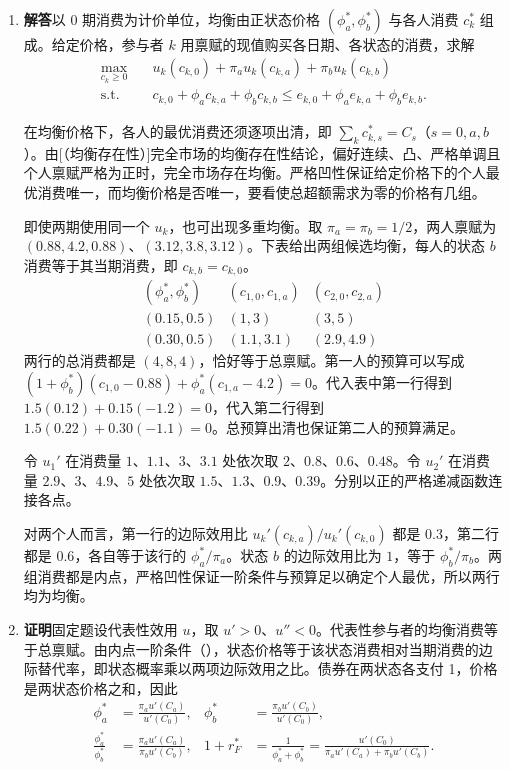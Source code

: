 \begin{solution}[blank-type=manual,blank-vsep=12\baselineskip]
\begin{enumerate}[label=(\alph*)]
 \item \textbf{解答}\quad 以 0 期消费为计价单位，均衡由正状态价格 $(\phi_a^*,\phi_b^*)$ 与各人消费 $c_k^*$ 组成。给定价格，参与者 $k$ 用禀赋的现值购买各日期、各状态的消费，求解
 \[
 \begin{aligned}
 \max_{c_k\ge0}\quad &u_k(c_{k,0})+\pi_a u_k(c_{k,a})+\pi_b u_k(c_{k,b})\\
 \text{s.t.}\quad &c_{k,0}+\phi_ac_{k,a}+\phi_bc_{k,b}
 \le e_{k,0}+\phi_ae_{k,a}+\phi_be_{k,b}.
 \end{aligned}
 \]

 在均衡价格下，各人的最优消费还须逐项出清，即 $\sum_kc_{k,s}^*=C_s$（$s=0,a,b$）。由\ifdefined\WJHandoutKnowledge {}[（均衡存在性）]\else 完全市场的均衡存在性结论\fi，偏好连续、凸、严格单调且个人禀赋严格为正时，完全市场存在均衡。严格凹性保证给定价格下的个人最优消费唯一，而均衡价格是否唯一，要看使总超额需求为零的价格有几组。

 即使两期使用同一个 $u_k$，也可出现多重均衡。取 $\pi_a=\pi_b=1/2$，两人禀赋为 $(0.88,4.2,0.88)$、$(3.12,3.8,3.12)$。下表给出两组候选均衡，每人的状态 $b$ 消费等于其当期消费，即 $c_{k,b}=c_{k,0}$。
 \[
 \begin{array}{c|cc}
 (\phi_a^*,\phi_b^*)&(c_{1,0},c_{1,a})&(c_{2,0},c_{2,a})\\\hline
 (0.15,0.5)&(1,3)&(3,5)\\
 (0.30,0.5)&(1.1,3.1)&(2.9,4.9)
 \end{array}
 \]
 两行的总消费都是 $(4,8,4)$，恰好等于总禀赋。第一人的预算可以写成 $(1+\phi_b^*)(c_{1,0}-0.88)+\phi_a^*(c_{1,a}-4.2)=0$。代入表中第一行得到 $1.5(0.12)+0.15(-1.2)=0$，代入第二行得到 $1.5(0.22)+0.30(-1.1)=0$。总预算出清也保证第二人的预算满足。

 令 $u_1'$ 在消费量 $1$、$1.1$、$3$、$3.1$ 处依次取 $2$、$0.8$、$0.6$、$0.48$。令 $u_2'$ 在消费量 $2.9$、$3$、$4.9$、$5$ 处依次取 $1.5$、$1.3$、$0.9$、$0.39$。分别以正的严格递减函数连接各点。

 对两个人而言，第一行的边际效用比 $u_k'(c_{k,a})/u_k'(c_{k,0})$ 都是 $0.3$，第二行都是 $0.6$，各自等于该行的 $\phi_a^*/\pi_a$。状态 $b$ 的边际效用比为 $1$，等于 $\phi_b^*/\pi_b$。两组消费都是内点，严格凹性保证一阶条件与预算足以确定个人最优，所以两行均为均衡。

 \item \textbf{证明}\quad 固定题设代表性效用 $u$，取 $u'>0$、$u''<0$。代表性参与者的均衡消费等于总禀赋。由内点一阶条件\ifdefined\WJHandoutKnowledge（）\fi，状态价格等于该状态消费相对当期消费的边际替代率，即状态概率乘以两项边际效用之比。债券在两状态各支付 1，价格是两状态价格之和，因此
 \[
 \begin{aligned}
 \phi_a^*&=\frac{\pi_au'(C_a)}{u'(C_0)},&
 \phi_b^*&=\frac{\pi_bu'(C_b)}{u'(C_0)},\\
 \frac{\phi_a^*}{\phi_b^*}&=\frac{\pi_au'(C_a)}{\pi_bu'(C_b)},&
 1+r_F^*&=\frac{1}{\phi_a^*+\phi_b^*}
          =\frac{u'(C_0)}{\pi_au'(C_a)+\pi_bu'(C_b)}.
 \end{aligned}
 \]


\end{enumerate}
\end{solution}
